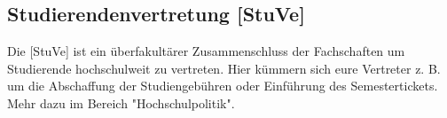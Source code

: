 \subsection{Studierendenvertretung [StuVe]}
Die [StuVe] ist ein überfakultärer Zusammenschluss der Fachschaften 
um Studierende hochschulweit zu vertreten. Hier kümmern sich 
eure Vertreter z. B. um die Abschaffung der Studiengebühren 
oder Einführung des Semestertickets. Mehr dazu im Bereich 
"Hochschulpolitik". 